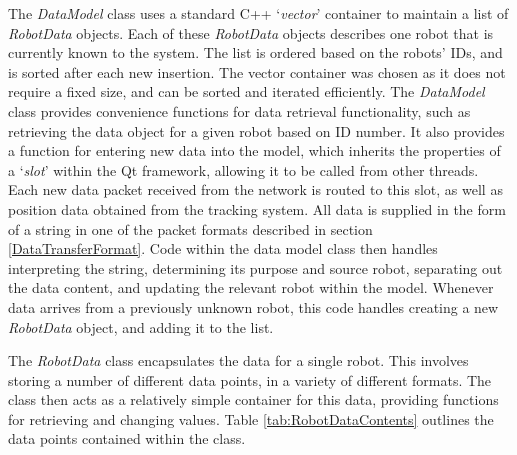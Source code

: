 The \textit{DataModel} class uses a standard C++ `\textit{vector}' container to maintain a list of \textit{RobotData} objects. Each of these \textit{RobotData} objects describes one robot that is currently known to the system. The list is ordered based on the robots' IDs, and is sorted after each new insertion. The vector container was chosen as it does not require a fixed size, and can be sorted and iterated efficiently. The \textit{DataModel} class provides convenience functions for data retrieval functionality, such as retrieving the data object for a given robot based on ID number. It also provides a function for entering new data into the model, which inherits the properties of a `\textit{slot}' within the Qt framework, allowing it to be called from other threads. Each new data packet received from the network is routed to this slot, as well as position data obtained from the tracking system. All data is supplied in the form of a string in one of the packet formats described in section \ref{DataTransferFormat}. Code within the data model class then handles interpreting the string, determining its purpose and source robot, separating out the data content, and updating the relevant robot within the model. Whenever data arrives from a previously unknown robot, this code handles creating a new \textit{RobotData} object, and adding it to the list.

The \textit{RobotData} class encapsulates the data for a single robot. This involves storing a number of different data points, in a variety of different formats. The class then acts as a relatively simple container for this data, providing functions for retrieving and changing values. Table \ref{tab:RobotDataContents} outlines the data points contained within the class.

